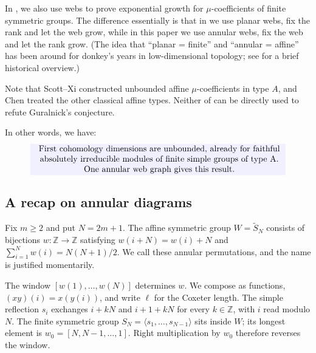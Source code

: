 \documentclass[a4paper,11pt]{amsart}
\let\emph\relax
\numberwithin{equation}{subsection}
\theoremstyle{plain}
\theoremstyle{definition}
\theoremstyle{remark}
\begin{document}
\begin{remark}
In \cite{Finite}, we also use webs to
prove exponential growth for $\mu$-coefficients of finite
symmetric groups. The difference essentially is that in \cite{Finite} we use planar webs, fix the rank and let the web grow, while in this paper we use annular webs, fix the web and let the rank grow.
(The idea that ``planar = finite'' and ``annular = affine'' has been around for donkey's years in low-dimensional topology; see \cite[Section~1B]{HT} for a brief historical overview.)

Note that Scott--Xi \cite{SX} constructed unbounded affine $\mu$-coefficients
in type $A$, and Chen \cite{Chen} treated the other classical affine
types. Neither of \cite{Chen,Finite,SX} can be directly used to refute 
Guralnick's conjecture.
\end{remark}

In other words, we have:
\[
\setlength{\fboxsep}{2pt}
\colorbox{blue!6}{
\begin{minipage}{0.85\textwidth}
\centering
\emph{First cohomology dimensions are unbounded, already for
faithful absolutely irreducible modules of finite simple
groups of type A. One annular web graph gives this result.}
\end{minipage}}
\]

\subsection{A recap on annular diagrams}

Fix $m\ge2$ and put $N=2m+1$. The affine symmetric group
$W=\widetilde S_N$ consists of bijections $w:\mathbb Z\to\mathbb Z$
satisfying $w(i+N)=w(i)+N$ and
$\sum_{i=1}^Nw(i)=N(N+1)/2$. We call these annular permutations, and the name is justified momentarily.

The window $[w(1),\ldots,w(N)]$ determines $w$.
We compose as functions, $(xy)(i)=x(y(i))$, and write $\ell$
for the Coxeter length. The simple reflection $s_i$ exchanges
$i+kN$ and $i+1+kN$ for every $k\in\mathbb Z$, with $i$ read
modulo $N$. The finite symmetric group
$S_N=\langle s_1,\ldots,s_{N-1}\rangle$ sits inside $W$;
its longest element is $w_0=[N,N-1,\ldots,1]$.
Right multiplication by $w_0$ therefore reverses the window.
\end{document}

